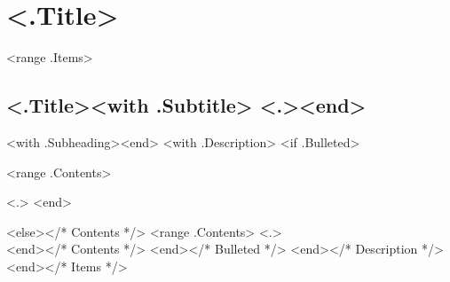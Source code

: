 \section{<.Title>}
<range .Items>
\subsection{\textbf{<.Title>}<with .Subtitle> <.><end>}
<with .Subheading><end>
<with .Description>
<if .Bulleted>
\begin{tightitemize}
<range .Contents>
\item <.>
<end> 
\end{tightitemize}
<else></* Contents */>
<range .Contents>
<.>\\
<end></* Contents */>
<end></* Bulleted */>
<end></* Description */>
<end></* Items */>